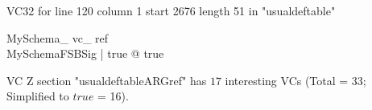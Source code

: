 \documentclass{article}
\begin{document}
VC32 for line 120 column 1 start 2676 length 51 in "usualdeftable"
\begin{theorem}{ MySchema\_ vc\_ ref}\\
 \exists MySchemaFSBSig | true @ true \\

\end{theorem}



 VC Z section "usualdeftableARGref" has $17$ interesting VCs (Total = 33; Simplified to $true$ = 16).



\end{document}
